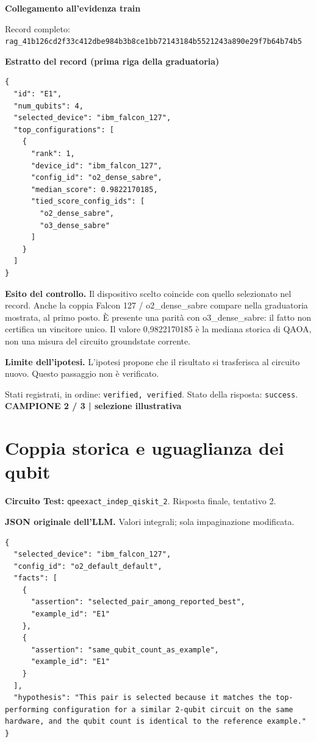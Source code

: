 \documentclass[a4paper,10pt]{article}
\newcommand{\tagline}[1]{{\small\color{ink}\textbf{#1}}\par}
\begin{document}
\textbf{Collegamento all'evidenza train}
\begin{center}\end{center}
{\footnotesize Record completo: \texttt{rag\_41b126cd2f33c412dbe984b3b8ce1bb72143184b5521243a890e29f7b64b74b5}}\par
\textbf{Estratto del record (prima riga della graduatoria)}
\begin{lstlisting}
{
  "id": "E1",
  "num_qubits": 4,
  "selected_device": "ibm_falcon_127",
  "top_configurations": [
    {
      "rank": 1,
      "device_id": "ibm_falcon_127",
      "config_id": "o2_dense_sabre",
      "median_score": 0.9822170185,
      "tied_score_config_ids": [
        "o2_dense_sabre",
        "o3_dense_sabre"
      ]
    }
  ]
}
\end{lstlisting}

\textbf{Esito del controllo.} Il dispositivo scelto coincide con quello selezionato nel record. Anche la coppia Falcon 127 / o2\_dense\_sabre compare nella graduatoria mostrata, al primo posto. È presente una parità con o3\_dense\_sabre: il fatto non certifica un vincitore unico. Il valore 0,9822170185 è la mediana storica di QAOA, non una misura del circuito groundstate corrente.\par
{\color{warn}\textbf{Limite dell'ipotesi.}} L'ipotesi propone che il risultato si trasferisca al circuito nuovo. Questo passaggio non è verificato.\par
{\small Stati registrati, in ordine: \texttt{verified, verified}. Stato della risposta: \texttt{success}.}
\newpage
\tagline{CAMPIONE 2 / 3 | selezione illustrativa}
\section*{Coppia storica e uguaglianza dei qubit}
\textbf{Circuito Test:} \texttt{qpeexact\_indep\_qiskit\_2}. Risposta finale, tentativo 2.\par
\textbf{JSON originale dell'LLM.} Valori integrali; sola impaginazione modificata.\par
\begin{lstlisting}
{
  "selected_device": "ibm_falcon_127",
  "config_id": "o2_default_default",
  "facts": [
    {
      "assertion": "selected_pair_among_reported_best",
      "example_id": "E1"
    },
    {
      "assertion": "same_qubit_count_as_example",
      "example_id": "E1"
    }
  ],
  "hypothesis": "This pair is selected because it matches the top-performing configuration for a similar 2-qubit circuit on the same hardware, and the qubit count is identical to the reference example."
}
\end{lstlisting}
\end{document}
